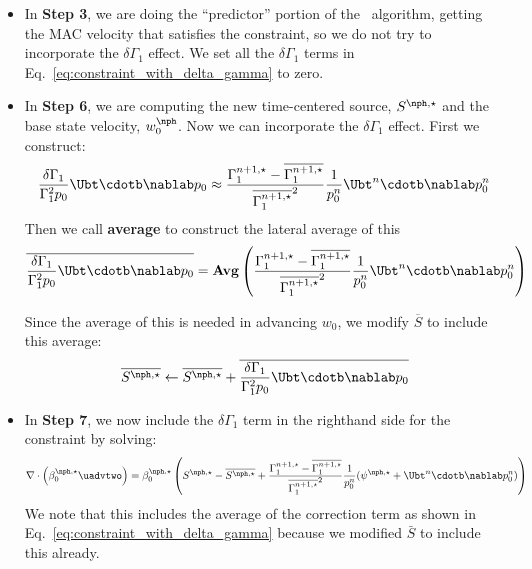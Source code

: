 \begin{itemize}

\item In {\bf Step 3}, we are doing the ``predictor'' portion of the 
\maestro\ algorithm, getting the MAC velocity that satisfies the constraint, 
so we do not try to incorporate the $\delta \Gamma_1$ effect.  We set
all the $\delta \Gamma_1$ terms in
Eq.~\ref{eq:constraint_with_delta_gamma} to zero.

\item In {\bf Step 6}, we are computing the new time-centered source, 
$S^{\nph,\star}$ and the base state velocity, $w_0^\nph$.  Now we can
incorporate the $\delta \Gamma_1$ effect.  First we construct:
\begin{equation}
\frac{\delta \Gamma_1}{\Gamma_1^2 p_0} \Ubt \cdotb \nablab p_0 \approx
   \frac{\Gamma_1^{n+1,\star} - \overline{\Gamma_1^{n+1,\star}}}
         {{\overline{\Gamma_1^{n+1,\star}}}^2} \frac{1}{p_0^n} \Ubt^n \cdotb \nablab p_0^n
\end{equation}
Then we call {\bf average} to construct the lateral average of this
\begin{equation}
\overline{\frac{\delta \Gamma_1}{\Gamma_1^2 p_0} \Ubt \cdotb \nablab p_0} = 
   \mathbf{Avg} \left (\frac{\Gamma_1^{n+1,\star} - \overline{\Gamma_1^{n+1,\star}}}
         {{\overline{\Gamma_1^{n+1,\star}}}^2} \frac{1}{p_0^n} \Ubt^n \cdotb \nablab p_0^n \right )
\end{equation}

Since the average of this is needed in advancing $w_0$, we modify $\overline{S}$ 
to include this average:
\begin{equation}
\overline{S^{\nph,\star}} \leftarrow \overline{S^{\nph,\star}} + 
   \overline{\frac{\delta \Gamma_1}{\Gamma_1^2 p_0} \Ubt \cdotb \nablab p_0} 
\end{equation}

\item In {\bf Step 7}, we now include the $\delta \Gamma_1$ term in the righthand
side for the constraint by solving:
\begin{equation}
\nabla \cdot \left(\beta_0^{\nph,\star} \uadvtwo\right) =
\beta_0^{\nph,\star}\left( S^{\nph,\star} - \overline{S^{\nph,\star}} +
   \frac{\Gamma_1^{n+1,\star} - \overline{\Gamma_1^{n+1,\star}}} 
         {{\overline{\Gamma_1^{n+1,\star}}}^2} \frac{1}{p_0^n} 
         (\psi^{\nph,\star} + \Ubt^n \cdotb \nablab p_0^n)
\right)
\end{equation}
We note that this includes the average of the correction term as shown
in Eq.~\ref{eq:constraint_with_delta_gamma} because we modified
$\bar{S}$ to include this already.


\end{itemize}

